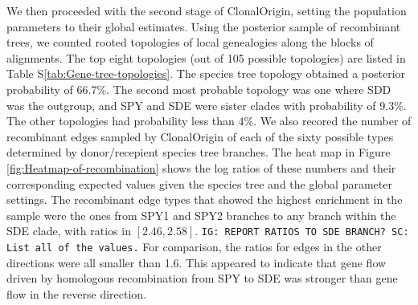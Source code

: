 \documentclass[english]{article}
\begin{document}
We then proceeded with the second stage of ClonalOrigin, setting the population 
parameters to their global estimates. 
Using the posterior sample of recombinant trees, we counted 
rooted topologies of local genealogies along the blocks of alignments. 
The top eight 
topologies (out of 105 possible topologies) are listed in Table 
S\ref{tab:Gene-tree-topologies}. The species tree topology obtained a posterior 
probability of 66.7\%. The second most probable topology was one where SDD was 
the outgroup, and SPY and SDE were sister clades with probability of 9.3\%.
The other topologies had probability less than 4\%. We also recored the 
number of recombinant edges sampled by ClonalOrigin of each of the sixty 
possible types determined by donor/recepient species tree branches. The heat 
map in Figure \ref{fig:Heatmap-of-recombination} shows the log ratios of 
these numbers and their corresponding expected values given the species tree and 
the global parameter settings. 
The recombinant edge types that showed the highest enrichment in the 
sample were the ones from SPY1 and SPY2 branches to any branch within the SDE 
clade, with ratios in $[2.46,2.58]$. 
\texttt{IG: REPORT RATIOS TO SDE BRANCH? SC: List all of the values.} 
For comparison, the ratios for edges in the other directions were all smaller 
than 1.6. This appeared to indicate that gene flow driven by homologous 
recombination from SPY to SDE was stronger than gene flow in the reverse 
direction.
\end{document}

